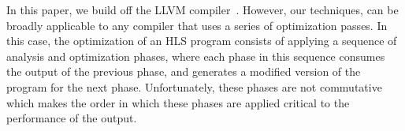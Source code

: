 In this paper, we build off the LLVM compiler~\cite{lattner2004llvm}. However, our techniques, can be broadly applicable to any compiler that uses a series of optimization passes.
In this case, the optimization of an HLS program consists of applying a sequence of analysis and optimization phases, where each phase in this sequence consumes the output of the previous phase, and generates a modified version of the program for the next phase. Unfortunately, these phases are not commutative which makes the order in which these phases are applied critical to the performance of the output. 


